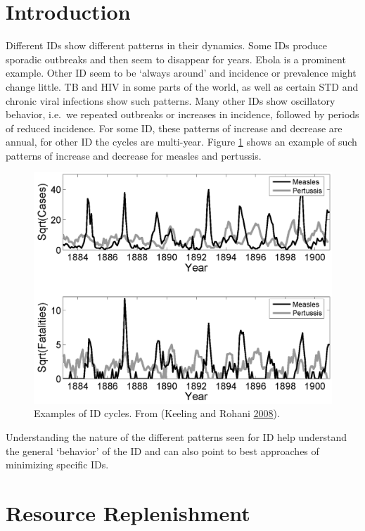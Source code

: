 \documentclass[]{book}
\theoremstyle{definition}
\theoremstyle{definition}
\theoremstyle{definition}
\theoremstyle{remark}
\begin{document}
\section{Introduction}\label{introduction-2}

Different IDs show different patterns in their dynamics. Some IDs
produce sporadic outbreaks and then seem to disappear for years. Ebola
is a prominent example. Other ID seem to be `always around' and
incidence or prevalence might change little. TB and HIV in some parts of
the world, as well as certain STD and chronic viral infections show such
patterns. Many other IDs show oscillatory behavior, i.e.~we repeated
outbreaks or increases in incidence, followed by periods of reduced
incidence. For some ID, these patterns of increase and decrease are
annual, for other ID the cycles are multi-year. Figure
\ref{fig:IDcycles} shows an example of such patterns of increase and
decrease for measles and pertussis.

\begin{figure}
\centering
\includegraphics{./images/IDcycles.png}
\caption{\label{fig:IDcycles}Examples of ID cycles. From (Keeling and Rohani
\protect\hyperlink{ref-keeling08}{2008}).}
\end{figure}

Understanding the nature of the different patterns seen for ID help
understand the general `behavior' of the ID and can also point to best
approaches of minimizing specific IDs.

\section{Resource Replenishment}\label{resource-replenishment}
\end{document}
